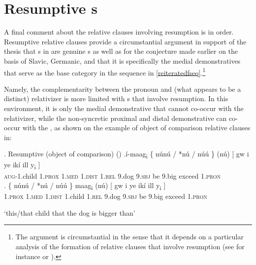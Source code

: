 \section{Resumptive s}

 A final comment about the  relative clauses involving resumption is in order. Resumptive relative clauses provide a circumstantial argument in support of the thesis that s in  are genuine s as well as for the conjecture made earlier on the basis of Slavic, Germanic, and  that it is specifically the medial demonstratives that serve as the base category in the  sequence in \ref{reiteratedfseq}.\footnote{The argument is circumstantial in the sense that it depends on a particular analysis of the formation of relative clauses that involve resumption (see for instance \citeauthor{Bianchi2004} \citeyear{Bianchi2004,Bianchi2011} or \citealt[chapters 2--3]{Salzmann2017}).
} %
\par
Namely, the complementarity between the  pronoun and (what appears to be a distinct) relativizer is more limited with s that involve resumption. In this environment, it is only the medial demonstrative that cannot co-occur with the relativizer, while the non-syncretic proximal and distal demonstrative can co-occur with the , as shown on the example of object of comparison relative clauses in:

\ex. Resumptive (object of comparison)  (\citealt[27]{Jenks-etall})
\ag.\'i-maag\textsubscript{i} \{ n\'un\'u / *n\'u / {n\'u\'u \}} (n\'u) [ gw i ye ik\'i ill {y\textsubscript{i} ]}\\
\textsc{aug}-1.child {} 1.\textsc{prox} {} \phantom{t}\textsc{1.med} {} {1.\textsc{dist}}
\phantom{l}\textsc{1.rel} {} 9.dog 9.\textsc{sbj} be 9.big exceed {1.\textsc{pron}}\\
\bg.  \{ n\'un\'u / *n\'u / {n\'u\'u \}} maag\textsubscript{i} (n\'u) [ gw i ye ik\'i ill {y\textsubscript{i} ]}\\
 {} 1.\textsc{prox} {} \phantom{t}\textsc{1.med} {} {1.\textsc{dist}} 1.child \phantom{t}\textsc{1.rel} {} 9.dog 9.\textsc{sbj} be 9.big exceed {1.\textsc{pron}}\\
\strut `this/that child that the dog is bigger than' 

